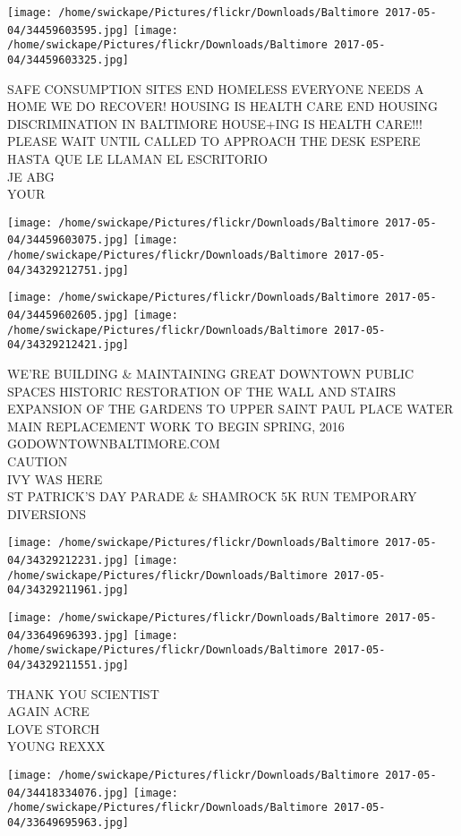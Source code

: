 \documentclass[10pt,letterpaper]{article}
\begin{document}
\texttt{[image: /home/swickape/Pictures/flickr/Downloads/Baltimore 2017-05-04/34459603595.jpg]}
\texttt{[image: /home/swickape/Pictures/flickr/Downloads/Baltimore 2017-05-04/34459603325.jpg]}

SAFE CONSUMPTION SITES END HOMELESS EVERYONE NEEDS A HOME WE DO RECOVER!  HOUSING IS HEALTH CARE END HOUSING DISCRIMINATION IN BALTIMORE HOUSE+ING IS HEALTH CARE!!!\\
PLEASE WAIT UNTIL CALLED TO APPROACH THE DESK ESPERE HASTA QUE LE LLAMAN EL ESCRITORIO\\
JE ABG\\
YOUR
\pagebreak

\texttt{[image: /home/swickape/Pictures/flickr/Downloads/Baltimore 2017-05-04/34459603075.jpg]}
\texttt{[image: /home/swickape/Pictures/flickr/Downloads/Baltimore 2017-05-04/34329212751.jpg]}

\texttt{[image: /home/swickape/Pictures/flickr/Downloads/Baltimore 2017-05-04/34459602605.jpg]}
\texttt{[image: /home/swickape/Pictures/flickr/Downloads/Baltimore 2017-05-04/34329212421.jpg]}

WE'RE BUILDING \& MAINTAINING GREAT DOWNTOWN PUBLIC SPACES HISTORIC RESTORATION OF THE WALL AND STAIRS EXPANSION OF THE GARDENS TO UPPER SAINT PAUL PLACE WATER MAIN REPLACEMENT WORK TO BEGIN SPRING, 2016 GODOWNTOWNBALTIMORE.COM\\
CAUTION\\
IVY WAS HERE\\
ST PATRICK'S DAY PARADE \& SHAMROCK 5K RUN TEMPORARY DIVERSIONS
\pagebreak

\texttt{[image: /home/swickape/Pictures/flickr/Downloads/Baltimore 2017-05-04/34329212231.jpg]}
\texttt{[image: /home/swickape/Pictures/flickr/Downloads/Baltimore 2017-05-04/34329211961.jpg]}

\texttt{[image: /home/swickape/Pictures/flickr/Downloads/Baltimore 2017-05-04/33649696393.jpg]}
\texttt{[image: /home/swickape/Pictures/flickr/Downloads/Baltimore 2017-05-04/34329211551.jpg]}

THANK YOU SCIENTIST\\
AGAIN ACRE\\
LOVE STORCH\\
YOUNG REXXX
\pagebreak

\texttt{[image: /home/swickape/Pictures/flickr/Downloads/Baltimore 2017-05-04/34418334076.jpg]}
\texttt{[image: /home/swickape/Pictures/flickr/Downloads/Baltimore 2017-05-04/33649695963.jpg]}
\end{document}
